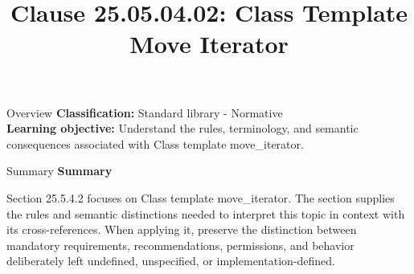 \documentclass[10pt,letterpaper]{article}
\title{Clause 25.05.04.02: Class Template Move Iterator}
\author{}
\date{}
\begin{document}
\maketitle
\begin{CornellOverviewBox}{Overview}
\textbf{Classification:} Standard library - Normative\\[2pt]
\textbf{Learning objective:} Understand the rules, terminology, and semantic consequences associated with Class template move\_iterator.
\end{CornellOverviewBox}\begin{CornellSummaryBox}{Summary}
{\sffamily\bfseries\color{Accent} Summary}\par\vspace{3pt}Section 25.5.4.2 focuses on Class template move\_iterator. The section supplies the rules and semantic distinctions needed to interpret this topic in context with its cross-references. When applying it, preserve the distinction between mandatory requirements, recommendations, permissions, and behavior deliberately left undefined, unspecified, or implementation-defined.
\end{CornellSummaryBox}
\end{document}
